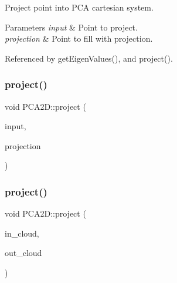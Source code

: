 Project point into P\+CA cartesian system. 


\begin{DoxyParams}{Parameters}
{\em input} & Point to project. \\
\hline
{\em projection} & Point to fill with projection. \\
\hline
\end{DoxyParams}


Referenced by get\+Eigen\+Values(), and project().

\mbox{\label{classPCA2D_a9768dbce5a3b9cd0b3aacbedc3301884}} 
\subsubsection{\texorpdfstring{project()}{project()}\hspace{0.1cm}{\footnotesize\ttfamily [2/4]}}
{\footnotesize\ttfamily void P\+C\+A2\+D\+::project (\begin{DoxyParamCaption}\item[{const \hyperlink{Normal2dEstimation_8h_ab8d898f36957cca40634530a6f118a3e}{Point} \&}]{input,  }\item[{\hyperlink{Normal2dEstimation_8h_ab8d898f36957cca40634530a6f118a3e}{Point} \&}]{projection }\end{DoxyParamCaption})\hspace{0.3cm}{\ttfamily [inline]}}

\mbox{\label{classPCA2D_ac36f8aacab8d6fe1d804f17cfa7b0f78}} 
\subsubsection{\texorpdfstring{project()}{project()}\hspace{0.1cm}{\footnotesize\ttfamily [3/4]}}
{\footnotesize\ttfamily void P\+C\+A2\+D\+::project (\begin{DoxyParamCaption}\item[{const \hyperlink{Normal2dEstimation_8h_a389a43addc496dc19a5bb0575cc60bc4}{Const\+Ptr\+Cloud} \&}]{in\+\_\+cloud,  }\item[{\hyperlink{Normal2dEstimation_8h_a2894055ff89c63cbae90e22dfddaa610}{Ptr\+Cloud} \&}]{out\+\_\+cloud }\end{DoxyParamCaption})}



